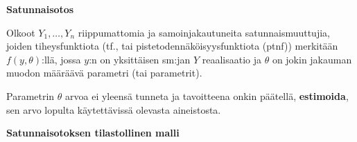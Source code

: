 \documentclass[
]{book}
\begin{document}
\begin{defblock}{}
\textbf{Satunnaisotos}

Olkoot \(Y_1, \ldots, Y_n\) riippumattomia ja samoinjakautuneita satunnaismuuttujia, joiden tiheysfunktiota (tf., tai pistetodennäköisyysfunktiota (ptnf)) merkitään \(f(y, \theta)\):llä, jossa \(y\):n on yksittäisen sm:jan \(Y\) reaalisaatio ja \(\theta\) on jokin jakauman muodon määräävä parametri (tai parametrit).

Parametrin \(\theta\) arvoa ei yleensä tunneta ja tavoitteena onkin päätellä, \textbf{estimoida}, sen arvo lopulta käytettävissä olevasta aineistosta.

\end{defblock}

\hfill\break

\textbf{Satunnaisotoksen tilastollinen malli}
\end{document}
